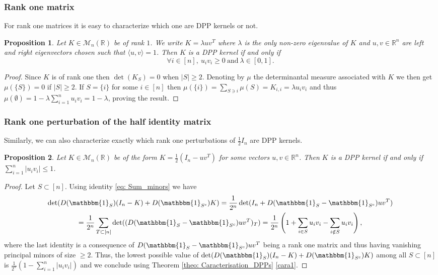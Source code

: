 \documentclass{article}
\numberwithin{equation}{section}
\renewcommand{\leq}{\leqslant}
\renewcommand{\geq}{\geqslant}
\newcommand{\bR}{\mathbb{R}}
\newcommand{\cara}[1]{\mathbbm{1}_{#1}}
\theoremstyle{plain}
\newtheorem{proposition}{Proposition}[section]
\begin{document}
\subsubsection*{Rank one matrix}

For rank one matrices it is easy to characterize which one are DPP kernels or not.

\begin{proposition}
Let $K\in\mathcal{M}_n(\bR)$ be of rank $1$. We write $K=\lambda uv^T$ where $\lambda$ is the only non-zero eigenvalue of $K$ and $u,v\in\bR^n$ are left and right eigenvectors chosen such that $\langle u, v\rangle=1$. Then $K$ is a DPP kernel if and only if 
\[\forall i\in [n],~u_iv_i\geq 0~\mbox{and}~\lambda\in [0, 1].\]
\end{proposition}
\begin{proof}
Since $K$ is of rank one then $\det(K_S)=0$ when $|S|\geq 2$. Denoting by $\mu$ the determinantal measure associated with $K$ we then get $\mu(\{S\})=0$ if $|S|\geq 2$. If $S=\{i\}$ for some $i\in [n]$ then $\mu(\{i\})=\sum_{S\ni i} \mu(S)= K_{i, i} = \lambda u_iv_i$ and thus $\mu(\emptyset)= 1 - \lambda \sum_{i=1}^n u_iv_i = 1 - \lambda$, proving the result.
\end{proof}

\subsubsection*{Rank one perturbation of the half identity matrix}

Similarly, we can also characterize exactly which rank one perturbations of $\frac{1}{2}I_n$ are DPP kernels.

\begin{proposition}
Let $K\in\mathcal{M}_n(\bR)$ be of the form $K=\frac{1}{2}(I_n - uv^T)$ for some vectors $u,v\in\bR^n$. Then $K$ is a DPP kernel if and only if $\sum_{i=1}^n|u_iv_i|\leq 1$.
\end{proposition}
\begin{proof}
Let $S\subset [n]$. Using identity \eqref{eq: Sum_minors} we have
\begin{multline*}
\det(D(\cara{S})(I_n-K)+D(\cara{S^c})K) = \frac{1}{2^n}\det(I_n + D(\cara{S} - \cara{S^c})uv^T) \\
= \frac{1}{2^n}\sum_{T\subset [n]}\det((D(\cara{S} - \cara{S^c})uv^T)_T)
= \frac{1}{2^n}\left(1 + \sum_{i\in S} u_iv_i - \sum_{i\notin S} u_iv_i\right),
\end{multline*}
where the last identity is a consequence of $D(\cara{S} - \cara{S^c})uv^T$ being a rank one matrix and thus having vanishing principal minors of size $\geq 2$. Thus, the lowest possible value of $\det(D(\cara{S})(I_n-K)+D(\cara{S^c})K)$ among all $S\subset [n]$ is $\frac{1}{2^n}(1 - \sum_{i=1}^n|u_iv_i|)$ and we conclude using Theorem \ref{theo: Caracterisation_DPPs} \ref{cara1}.
\end{proof}
\end{document}
